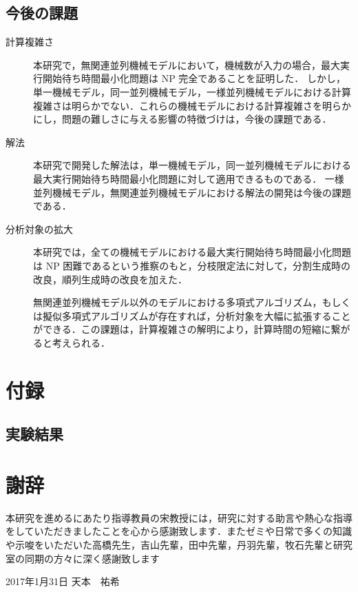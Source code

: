 \documentclass[12pt]{optlab-bachelor}
\def\氏名{天本　祐希}
\begin{document}
\section{今後の課題}
\begin{description}
  \item[計算複雑さ ] 本研究で，無関連並列機械モデルにおいて，機械数が入力の場合，最大実行開始待ち時間最小化問題は NP 完全であることを証明した．
  しかし，単一機械モデル，同一並列機械モデル，一様並列機械モデルにおける計算複雑さは明らかでない．これらの機械モデルにおける計算複雑さを明らかにし，問題の難しさに与える影響の特徴づけは，今後の課題である．

  \item[解法 ] 本研究で開発した解法は，単一機械モデル，同一並列機械モデルにおける最大実行開始待ち時間最小化問題に対して適用できるものである．
  一様並列機械モデル，無関連並列機械モデルにおける解法の開発は今後の課題である．

  \item[分析対象の拡大 ] 本研究では，全ての機械モデルにおける最大実行開始待ち時間最小化問題は NP 困難であるという推察のもと，分枝限定法に対して，分割生成時の改良，順列生成時の改良を加えた．

  無関連並列機械モデル以外のモデルにおける多項式アルゴリズム，もしくは擬似多項式アルゴリズムが存在すれば，分析対象を大幅に拡張することができる．この課題は，計算複雑さの解明により，計算時間の短縮に繋がると考えられる．

\end{description}

\chapter{付録}\label{c_7}
\section{実験結果}






\chapter*{謝辞}
本研究を進めるにあたり指導教員の宋教授には，研究に対する助言や熱心な指導をしていただきましたことを心から感謝致します．またゼミや日常で多くの知識や示唆をいただいた高橋先生，吉山先輩，田中先輩，丹羽先輩，牧石先輩と研究室の同期の方々に深く感謝致します

\begin{flushright}
  2017年1月31日 \氏名
\end{flushright}
\endmatter
\end{document}
